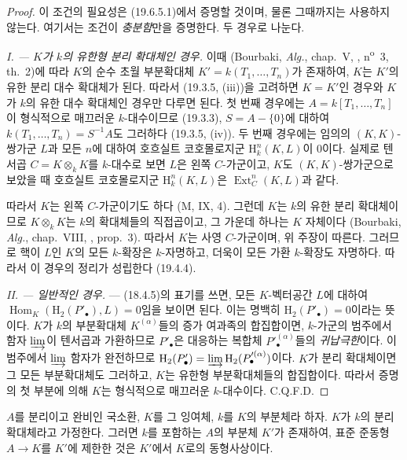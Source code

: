 \begin{proof}
이 조건의 필요성은 (19.6.5.1)에서 증명할 것이며, 물론 그때까지는
사용하지 않는다. 여기서는 조건이 \emph{충분함}만을 증명한다. 두
경우로 나눈다.

\emph{I. --- $K$가 $k$의 유한형 분리 확대체인 경우.} 이때
(Bourbaki, \emph{Alg.}, chap.~V, ,
n\textsuperscript{o}~3, th.~2)에 따라 $K$의 순수 초월 부분확대체
$K'=k(T_1,\ldots,T_n)$가 존재하여, $K$는 $K'$의 유한 분리 대수
확대체가 된다. 따라서 (19.3.5, (iii))을 고려하면 $K=K'$인 경우와
$K$가 $k$의 유한 대수 확대체인 경우만 다루면 된다. 첫 번째 경우에는
$A=k[T_1,\ldots,T_n]$이 형식적으로 매끄러운 $k$-대수이므로
(19.3.3), $S=A-\{0\}$에 대하여
$k(T_1,\ldots,T_n)=S^{-1}A$도 그러하다 (19.3.5, (iv)). 두 번째
경우에는 임의의 $(K,K)$-쌍가군 $L$과 모든 $n$에 대하여 호흐실트
코호몰로지군 $\mathrm H_k^n(K,L)$이 $0$이다. 실제로 텐서곱
$C=K\otimes_k K$를 $k$-대수로 보면 $L$은 왼쪽 $C$-가군이고,
$K$도 $(K,K)$-쌍가군으로 보았을 때 호흐실트 코호몰로지군
$\mathrm H_k^n(K,L)$은 $\operatorname{Ext}_C^n(K,L)$과 같다.


따라서 $K$는 왼쪽 $C$-가군이기도 하다 (M, IX, 4). 그런데 $K$는
$k$의 유한 분리 확대체이므로 $K\otimes_k K$는 $k$의 확대체들의
직접곱이고, 그 가운데 하나는 $K$ 자체이다 (Bourbaki, \emph{Alg.},
chap.~VIII, , prop.~3). 따라서 $K$는 사영 $C$-가군이며,
위 주장이 따른다. 그러므로 핵이 $L$인 $K$의 모든 $k$-확장은
$k$-자명하고, 더욱이 모든 가환 $k$-확장도 자명하다. 따라서 이
경우의 정리가 성립한다 (19.4.4).

\emph{II. --- 일반적인 경우.} --- (18.4.5)의 표기를 쓰면, 모든
$K$-벡터공간 $L$에 대하여
$\operatorname{Hom}_K(\mathrm H_2(P'_\bullet),L)=0$임을 보이면 된다.
이는 명백히 $\mathrm H_2(P'_\bullet)=0$이라는 뜻이다. $K$가 $k$의
부분확대체 $K^{(\alpha)}$들의 증가 여과족의 합집합이면,
$k$-가군의 범주에서 함자 $\varinjlim$이 텐서곱과 가환하므로
$P'_\bullet$은 대응하는 복합체 $P'^{(\alpha)}_\bullet$들의
\emph{귀납극한}이다. 이 범주에서 $\varinjlim$ 함자가 완전하므로
$\mathrm H_2(P'_\bullet)
=\varinjlim\mathrm H_2(P'^{(\alpha)}_\bullet)$이다. $K$가 분리
확대체이면 그 모든 부분확대체도 그러하고, $K$는
유한형 부분확대체들의 합집합이다. 따라서 증명의 첫 부분에 의해
$K$는 형식적으로 매끄러운 $k$-대수이다. C.Q.F.D.
\end{proof}

\begin{corollary}[19.6.2]
\label{0.19.6.2-ko}
$A$를 분리이고 완비인 국소환, $K$를 그 잉여체, $k$를 $K$의
부분체라 하자. $K$가 $k$의 분리 확대체라고 가정한다. 그러면 $k$를
포함하는 $A$의 부분체 $K'$가 존재하여, 표준 준동형 $A\to K$를
$K'$에 제한한 것은 $K'$에서 $K$로의 동형사상이다.
\end{corollary}

